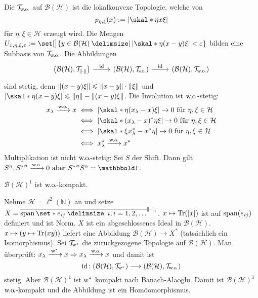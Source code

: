 \begin{erinnerungA}[{name=[schwache Operatortopologie]}]
	Die  $\TWeakOp$ auf $\mathcal{B}(\mathcal{H})$ ist die lokalkonvexe Topologie, welche von 
	\[
		p_{\eta,\xi}(x) := \abs*{\skal*{\eta}{x \xi}} 
	\]
	für $\eta,\xi \in \mathcal{H}$ erzeugt wird.
	Die Mengen $U_{x,\eta,\xi,\varepsilon} := \set[\big]{y \in \mathcal{B}(\mathcal{H}) \given \abs*{\skal*{\eta}{(x-y)\xi}} < \varepsilon}$ bilden eine Subbasis von $\TWeakOp$.
	Die Abbildungen
	\[
		\begin{tikzcd}
			\enbrace*{\mathcal{B}(\mathcal{H}),\Top{\norm*{\cdot}}} \rar["\id"] & \enbrace*{\mathcal{B}(\mathcal{H}),\Top{\so}} \rar["\id"] & \enbrace*{\mathcal{B}(\mathcal{H}), \TWeakOp}
		\end{tikzcd}
	\]
	sind stetig, denn $\norm*{(x-y)\xi} \le \norm*{x-y} \cdot \norm*{\xi}$ und $\abs*{ \skal*{\eta}{(x-y)\xi}} \le \norm*{\eta} - \norm*{(x-y) \xi}$.
	Die Involution ist $\wo$-stetig:
	\begin{align}
		x_\lambda \grenzw{\wo} x &\iff \abs*{\skal*{\eta}{(x_\lambda-x)\xi}} \to 0 \text{ für } \eta,\xi \in \mathcal{H} \\
		&\iff \abs*{\skal*{(x_\lambda-x)^* \eta}{\xi}}   \to 0 \text{ für } \eta,\xi \in \mathcal{H} \\
		&\iff \abs*{\skal*{\xi}{x_\lambda^* -x^* \eta}} \to 0 \text{ für } \eta,\xi \in \mathcal{H} \\
		&\iff x_\lambda^* \grenzw{\wo} x^* 
	\end{align}
	Multiplikation ist nicht $\wo$-stetig: Sei $S$ der Shift. Dann gilt
	\(
		S^n,{S^*}^n \grenzw{\wo} 0 \text{ aber } {S^*}^n S^n=\ind
	\).
\end{erinnerungA}

\begin{satz}[{naem=[Einheitskugel der beschränkten Operatoren ist wo-kompakt]}]
	$\mathcal{B}(\mathcal{H})^1$ ist $\wo$-kompakt.
\end{satz}
\begin{beweis}[name={Skizze}]
	Nehme $\mathcal{H}=\ell^2(\mathbb{N})$ an und setze $X= \overline{\Span\set*{e_{ij} \given i,i=1,2,\ldots }}^{\norm*{\cdot}_1}$.
	$x \mapsto \Tr(\abs*{x})$ ist auf $\Span (e_{ij})$ definiert und ist Norm.
	$X$ ist ein abgeschlossenes Ideal in $\mathcal{B}(\mathcal{H})$. 
	$x \mapsto  \enbrace*{y \mapsto \Tr(xy)}$ liefert eine Abbildung $\mathcal{B}(\mathcal{H}) \to X^*$ (tatsächlich ein Isomorphismus).
	Sei $\TWeakStar$ die zurückgezogene Topologie auf $\mathcal{B}(\mathcal{H})$.
	Man überprüft: $x_\lambda \grenzw{\w^*}x \Rightarrow x_\lambda\grenzw{\wo}x$ und damit ist
	\[
		\id \colon \enbrace*{\mathcal{B}(\mathcal{H}), \TWeakStar} \longrightarrow \enbrace*{\mathcal{B}(\mathcal{H}),\TWeakOp}
	\]
	stetig.
	Aber $\mathcal{B}(\mathcal{H})^1$ ist $\w^*$ kompakt nach Banach-Alaoglu. 
	Damit ist $\mathcal{B}(\mathcal{H})^1$ $\wo$-kompakt und die Abbildung ist ein Homöomorphismus.
\end{beweis}

